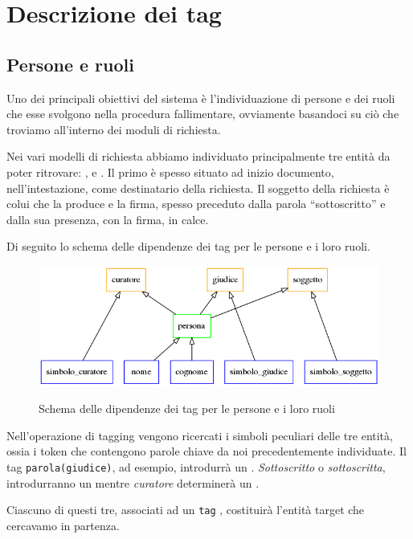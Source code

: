 
\section{Descrizione dei tag}

\subsection{Persone e ruoli}
Uno dei principali obiettivi del sistema è l'individuazione di persone e dei ruoli che esse svolgono nella procedura fallimentare, ovviamente basandoci su ciò che troviamo all'interno dei moduli di richiesta.

Nei vari modelli di richiesta abbiamo individuato principalmente tre entità da poter ritrovare: ,  e .
Il primo è spesso situato ad inizio documento, nell'intestazione, come destinatario della richiesta.
Il soggetto della richiesta è colui che la produce e la firma, spesso preceduto dalla parola ``sottoscritto'' e dalla sua presenza, con la firma, in calce.

Di seguito lo schema delle dipendenze dei tag per le persone e i loro ruoli.

\begin{figure}[H]
\centering
\includegraphics[width=.7\textwidth]{img/persona.png}
\label{fig:persona}
\caption[Dipendenze tra i tag - Persone]{Schema delle dipendenze dei tag per le persone e i loro ruoli}
\end{figure}

Nell'operazione di tagging vengono ricercati i simboli peculiari delle tre entità, ossia i token che contengono parole chiave da noi precedentemente individuate.
Il tag \verb|parola(giudice)|, ad esempio, introdurrà un . \emph{Sottoscritto} o \emph{sottoscritta}, introdurranno un  mentre \emph{curatore} determinerà un .

Ciascuno di questi tre, associati ad un \verb|tag| , costituirà l'entità target che cercavamo in partenza.

